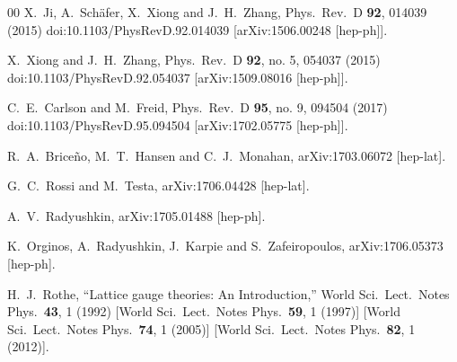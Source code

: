 \begin{thebibliography}{00}
	X.~Ji, A.~Sch\"afer, X.~Xiong and J.~H.~Zhang,
	Phys.\ Rev.\ D {\bf 92}, 014039 (2015)
	doi:10.1103/PhysRevD.92.014039
	[arXiv:1506.00248 [hep-ph]].


	X.~Xiong and J.~H.~Zhang,
	Phys.\ Rev.\ D {\bf 92}, no. 5, 054037 (2015)
	doi:10.1103/PhysRevD.92.054037
	[arXiv:1509.08016 [hep-ph]].


	C.~E.~Carlson and M.~Freid,
	Phys.\ Rev.\ D {\bf 95}, no. 9, 094504 (2017)
	doi:10.1103/PhysRevD.95.094504
	[arXiv:1702.05775 [hep-ph]].


	R.~A.~Brice\~no, M.~T.~Hansen and C.~J.~Monahan,
	arXiv:1703.06072 [hep-lat].


	G.~C.~Rossi and M.~Testa,
	arXiv:1706.04428 [hep-lat].


	A.~V.~Radyushkin,
	arXiv:1705.01488 [hep-ph].


	K.~Orginos, A.~Radyushkin, J.~Karpie and S.~Zafeiropoulos,
	arXiv:1706.05373 [hep-ph].


	H.~J.~Rothe,
	``Lattice gauge theories: An Introduction,''
	World Sci.\ Lect.\ Notes Phys.\  {\bf 43}, 1 (1992)
	[World Sci.\ Lect.\ Notes Phys.\  {\bf 59}, 1 (1997)]
	[World Sci.\ Lect.\ Notes Phys.\  {\bf 74}, 1 (2005)]
	[World Sci.\ Lect.\ Notes Phys.\  {\bf 82}, 1 (2012)].







\end{thebibliography}
